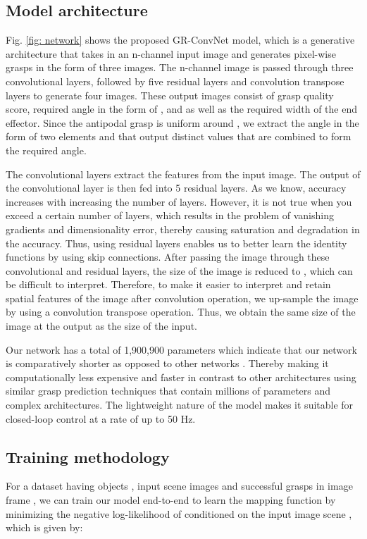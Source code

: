\documentclass[letterpaper, 10pt, conference]{IEEEtran}
\begin{document}
\subsection{Model architecture}
Fig. \ref{fig: network} shows the proposed GR-ConvNet model, which is a generative architecture that takes in an n-channel input image and generates pixel-wise grasps in the form of three images. The n-channel image is passed through three convolutional layers, followed by five residual layers and convolution transpose layers to generate four images. These output images consist of grasp quality score, required angle in the form of , and  as well as the required width of the end effector. Since the antipodal grasp is uniform around , we extract the angle in the form of two elements  and  that output distinct values that are combined to form the required angle.

The convolutional layers extract the features from the input image. The output of the convolutional layer is then fed into 5 residual layers. As we know, accuracy increases with increasing the number of layers. However, it is not true when you exceed a certain number of layers, which results in the problem of vanishing gradients and dimensionality error, thereby causing saturation and degradation in the accuracy. Thus, using residual layers enables us to better learn the identity functions by using skip connections. After passing the image through these convolutional and residual layers, the size of the image is reduced to , which can be difficult to interpret. Therefore, to make it easier to interpret and retain spatial features of the image after convolution operation, we up-sample the image by using a convolution transpose operation. Thus, we obtain the same size of the image at the output as the size of the input. 

Our network has a total of 1,900,900 parameters which indicate that our network is comparatively shorter as opposed to other networks \cite{kumra2017robotic, zhou2018fully, Asif2018EnsembleNetIG}. Thereby making it computationally less expensive and faster in contrast to other architectures using similar grasp prediction techniques that contain millions of parameters and complex architectures. The lightweight nature of the model makes it suitable for closed-loop control at a rate of up to 50 Hz.

\subsection{Training methodology}
For a dataset having objects , input scene images  and successful grasps in image frame , we can train our model end-to-end to learn the mapping function  by minimizing the negative log-likelihood of  conditioned on the input image scene , which is given by:
\end{document}
